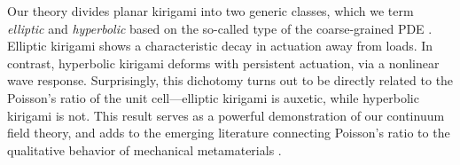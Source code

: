 \documentclass[aps,prl,twocolumn,superscriptaddress]{revtex4-1}
\begin{document}
Our theory divides  planar kirigami into two generic classes, which we term  \textit{elliptic} and \textit{hyperbolic} based on the so-called type of the coarse-grained PDE \cite{courant2008methods,evans10}. %
Elliptic kirigami shows a characteristic decay in actuation away from  loads. In contrast, hyperbolic kirigami deforms with persistent actuation, via a nonlinear wave response. Surprisingly, this dichotomy turns out to be directly related to the Poisson's ratio of the unit cell---elliptic kirigami is auxetic, while hyperbolic kirigami is not. This result serves as a powerful demonstration of our continuum field theory, and adds to the emerging literature connecting Poisson's ratio to the qualitative behavior of  mechanical metamaterials \cite{Wei2013, nassar2017curvature,lebee2018fitting,rocklin2017transformable}.




 
\end{document}
